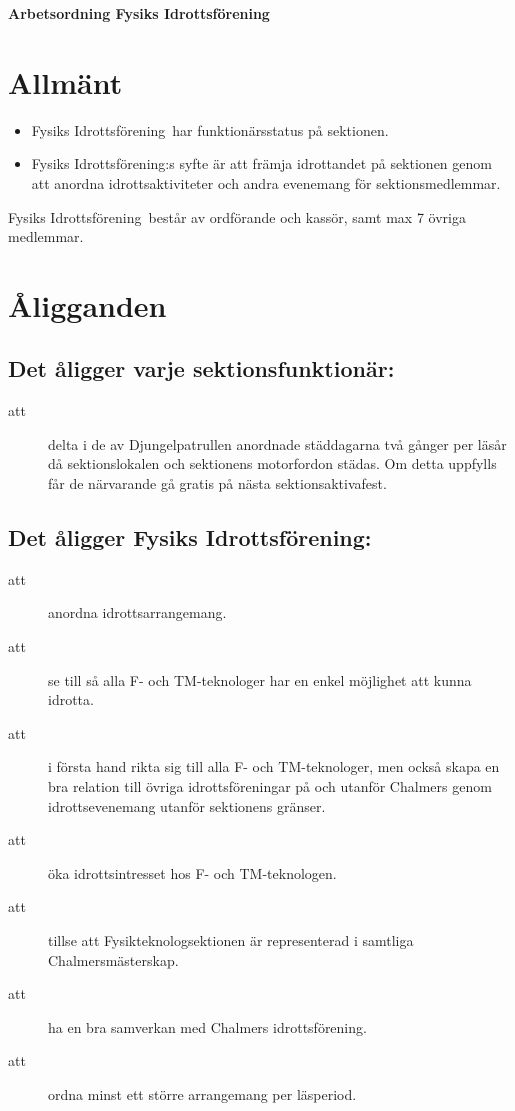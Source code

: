 \renewcommand{\dateseparator}{-} %

\renewcommand{\forening}{Fysiks Idrottsförening}


\begin{center}
\LARGE{\textbf{Arbetsordning \forening}}
\end{center}


\section{Allmänt}
\begin{itemize}
\item \forening \ har funktionärsstatus på sektionen.
\item \forening:s syfte är att främja idrottandet på sektionen genom att anordna idrottsaktiviteter och andra evenemang för sektionsmedlemmar.

\end{itemize}

\forening \ består av ordförande och kassör, samt max 7 övriga medlemmar.

\section{Åligganden}
\subsection{Det åligger varje sektionsfunktionär:}
    \begin{description}
      \item[att] delta i de av Djungelpatrullen anordnade städdagarna två gånger per
      läsår då sektionslokalen och sektionens motorfordon städas. Om detta uppfylls får de närvarande gå gratis på nästa
      sektionsaktivafest.
    \end{description}

\subsection{Det åligger \forening:}
    \begin{description}
      \item[att] anordna idrottsarrangemang.
      \item[att] se till så alla F- och TM-teknologer har en enkel möjlighet att kunna idrotta.
      \item[att] i första hand rikta sig till alla F- och TM-teknologer, men
      också skapa en bra relation till övriga idrottsföreningar på och
      utanför Chalmers genom idrottsevenemang utanför sektionens
      gränser.
      \item[att] öka idrottsintresset hos F- och TM-teknologen.
      \item[att] tillse att Fysikteknologsektionen är representerad i samtliga Chalmers\-mäst\-er\-skap.
      \item[att] ha en bra samverkan med Chalmers idrottsförening.
      \item[att] ordna minst ett större arrangemang per läsperiod.
    \end{description}

